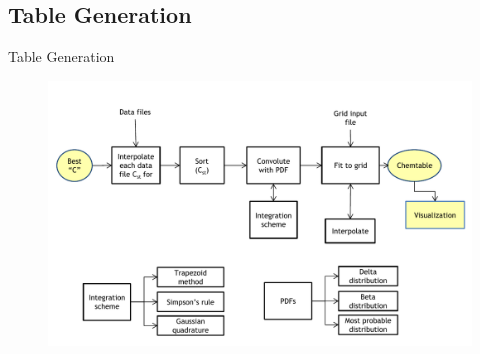 \documentclass{beamer}
\begin{document}
\subsection{Table Generation}
\begin{frame}{Table Generation}
\begin{figure}
\includegraphics[width=\textwidth]{diagram_2_shortened_v1.pdf}
\end{figure}
\end{frame}
\end{document}
